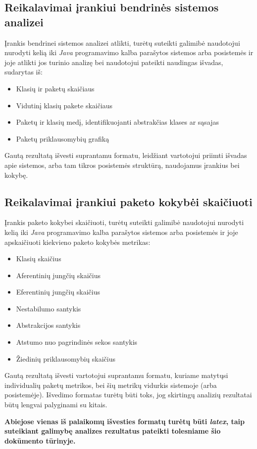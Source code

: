 \subsection{Reikalavimai įrankiui bendrinės sistemos analizei}
Įrankis bendrinei sistemos analizei atlikti, turėtų suteikti galimibė naudotojui nurodyti kelią iki \textit{Java} programavimo kalba parašytos sistemos arba posistemės ir joje
atlikti jos turinio analizę bei naudotojui pateikti naudingas išvadas, sudarytas iš:
\begin{itemize}
    \item Klasių ir paketų skaičiaus
    \item Vidutinį klasių pakete skaičiaus
    \item Paketų ir klasių medį, identifikuojanti abstrakčias klases ar sąsajas
    \item Paketų priklausomybių grafiką
\end{itemize}
Gautą rezultatą išvesti suprantamu formatu, leidžiant vartotojui priimti išvadas apie sistemos, arba tam tikros
posistemės struktūrą, naudojamus įrankius bei kokybę.

\subsection{Reikalavimai įrankiui paketo kokybėi skaičiuoti}
Įrankis paketo kokybei skaičiuoti, turėtų suteikti galimibė naudotojui nurodyti kelią iki \textit{Java} programavimo kalba parašytos sistemos arba posistemės ir joje
apskaičiuoti kiekvieno paketo kokybės metrikas:
\begin{itemize}
    \item Klasių skaičius
    \item Aferentinių jungčių skaičius
    \item Eferentinių jungčių skaičius
    \item Nestabilumo santykis
    \item Abstrakcijos santykis
    \item Atstumo nuo pagrindinės sekos santykis
    \item Žiedinių priklausomybių skaičius
\end{itemize}
Gautą rezultatą išvesti vartotojui suprantamu formatu, kuriame matytųsi individualių paketų metrikos, bei šių metrikų vidurkis sistemoje (arba posistemėje).
Išvedimo formatas turėtų būti toks, jog skirtingų analizių rezultatai būtų lengvai palyginami su kitais.

\textbf{Abiejose vienas iš palaikomų išvesties formatų turėtų būti \textit{latex}, taip suteikiant galimybę analizes rezultatus pateikti tolesniame šio dokūmento tūrinyje.}

